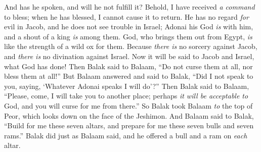 \begin{biblechapter}
And has he spoken, and will he not fulfill it?
\verse Behold, I have received \textit{a command} to bless; 
when he has blessed, I cannot cause it to return.
\verse He has no regard \textit{for} evil in Jacob, 
and he does not see trouble in Israel; 
Adonai his God \textit{is} with him, 
and a shout of a king \textit{is} among them.
\verse God, who brings them out from Egypt, 
\textit{is} like the strength of a wild ox for them.
\verse Because \textit{there is} no sorcery against Jacob, 
and \textit{there is} no divination against Israel. 
Now it will be said to Jacob and Israel, 
what God has done!
\verse Then Balak said to Balaam, “Do not curse them at all, nor bless them at all!”
\verse But Balaam answered and said to Balak, “Did I not speak to you, saying, ‘Whatever Adonai speaks I will do’?”
\verse Then Balak said to Balaam, “Please, come, I will take you to another place; perhaps \textit{it will be acceptable to} God, and you will curse for me from there.”
\verse So Balak took Balaam \textit{to} the top of Peor, which looks down on the face of the Jeshimon.
\verse And Balaam said to Balak, “Build for me these seven altars, and prepare for me these seven bulls and seven rams.”
\verse Balak did just as Balaam said, and he offered a bull and a ram on \textit{each} altar.
\end{biblechapter}

